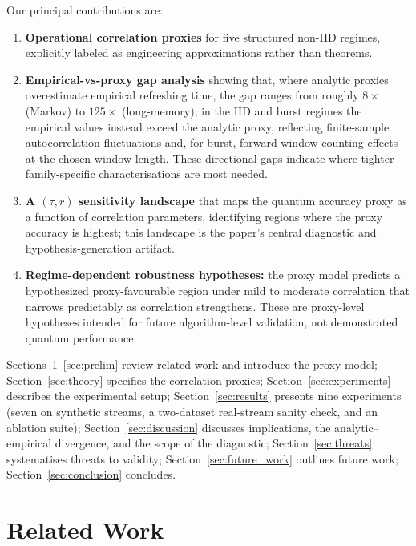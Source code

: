 \documentclass[sensors,article,submit,pdftex,moreauthors]{Definitions/mdpi}
\begin{document}
Our principal contributions are:

\begin{enumerate}
    \item \textbf{Operational correlation proxies} for five structured non\nobreakdash-IID regimes, explicitly labeled as engineering approximations rather than theorems.

    \item \textbf{Empirical-vs-proxy gap analysis} showing that, where analytic proxies overestimate empirical refreshing time, the gap ranges from roughly $8\times$ (Markov) to $125\times$ (long-memory); in the IID and burst regimes the empirical values instead exceed the analytic proxy, reflecting finite\nobreakdash-sample autocorrelation fluctuations and, for burst, forward\nobreakdash-window counting effects at the chosen window length. These directional gaps indicate where tighter family-specific characterisations are most needed.

    \item \textbf{A $(\tau, r)$ sensitivity landscape} that maps the quantum accuracy proxy as a function of correlation parameters, identifying regions where the proxy accuracy is highest; this landscape is the paper's central diagnostic and hypothesis-generation artifact.

    \item \textbf{Regime-dependent robustness hypotheses:} the proxy model predicts a hypothesized proxy-favourable region under mild to moderate correlation that narrows predictably as correlation strengthens. These are proxy-level hypotheses intended for future algorithm-level validation, not demonstrated quantum performance.
\end{enumerate}

Sections~\ref{sec:related}--\ref{sec:prelim} review related work and introduce the proxy model; Section~\ref{sec:theory} specifies the correlation proxies; Section~\ref{sec:experiments} describes the experimental setup; Section~\ref{sec:results} presents nine experiments (seven on synthetic streams, a two\nobreakdash-dataset real-stream sanity check, and an ablation suite); Section~\ref{sec:discussion} discusses implications, the analytic--empirical divergence, and the scope of the diagnostic; Section~\ref{sec:threats} systematises threats to validity; Section~\ref{sec:future_work} outlines future work; Section~\ref{sec:conclusion} concludes.


\section{Related Work}
\label{sec:related}
\end{document}
